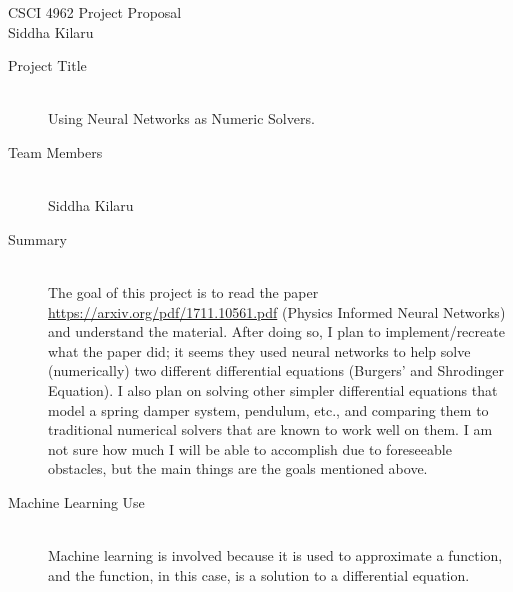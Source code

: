 \documentclass[12pt]{article}
\begin{document}
\noindent CSCI 4962 \hfill Project Proposal \\
Siddha Kilaru \\

\begin{description}
    \item[Project Title] \hfill \\
    Using Neural Networks as Numeric Solvers.

    \item[Team Members] \hfill \\
    Siddha Kilaru

    \item[Summary] \hfill \\
    The goal of this project is to read the paper
    \url{https://arxiv.org/pdf/1711.10561.pdf} (Physics Informed Neural
    Networks) and understand the material. After doing so, I plan to
    implement/recreate what the paper did; it seems they used neural networks
    to help solve (numerically) two different differential equations (Burgers'
    and Shrodinger Equation). I also plan on solving other simpler differential
    equations that model a spring damper system, pendulum, etc., and comparing
    them to traditional numerical solvers that are known to work well on them.
    I am not sure how much I will be able to accomplish due to foreseeable
    obstacles, but the main things are the goals mentioned above.

    \item[Machine Learning Use] \hfill \\
    Machine learning is involved because it is used to approximate a function,
    and the function, in this case, is a solution to a differential equation.
\end{description}
\end{document}
